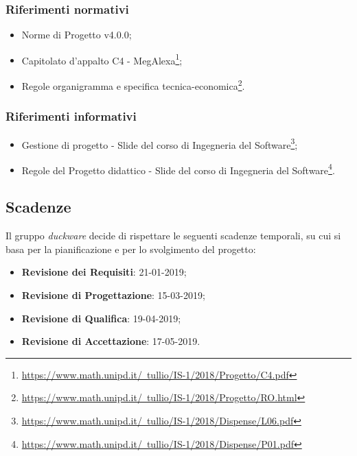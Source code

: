 \subsubsection{Riferimenti normativi}
\begin{itemize}
	\item Norme di Progetto v4.0.0;
	\item Capitolato d'appalto C4 - MegAlexa\footnote{\href{https://www.math.unipd.it/~tullio/IS-1/2018/Progetto/C4.pdf}{https://www.math.unipd.it/~tullio/IS-1/2018/Progetto/C4.pdf}};
	\item Regole organigramma e specifica tecnica-economica\footnote{\href{https://www.math.unipd.it/~tullio/IS-1/2018/Progetto/RO.html}{https://www.math.unipd.it/~tullio/IS-1/2018/Progetto/RO.html}}.
\end{itemize}
\subsubsection{Riferimenti informativi}
\begin{itemize}
	\item Gestione di progetto - Slide del corso di Ingegneria del Software\footnote{\href{https://www.math.unipd.it/~tullio/IS-1/2018/Dispense/L06.pdf}{https://www.math.unipd.it/~tullio/IS-1/2018/Dispense/L06.pdf}};
	\item Regole del Progetto didattico - Slide del corso di Ingegneria del Software\footnote{\href{https://www.math.unipd.it/~tullio/IS-1/2018/Dispense/P01.pdf}{https://www.math.unipd.it/~tullio/IS-1/2018/Dispense/P01.pdf}}.
\end{itemize}

\subsection{Scadenze}
Il gruppo \emph{duckware} decide di rispettare le seguenti scadenze temporali, su cui si basa per la pianificazione e per lo svolgimento del progetto:
\begin{itemize}
	\item \textbf{Revisione dei Requisiti}: 21-01-2019;
	\item \textbf{Revisione di Progettazione}: 15-03-2019;
	\item \textbf{Revisione di Qualifica}: 19-04-2019;
	\item \textbf{Revisione di Accettazione}: 17-05-2019.
\end{itemize}
